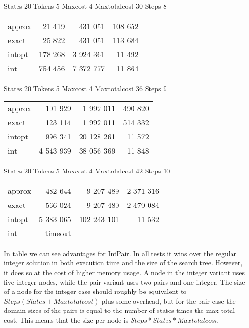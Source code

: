 \documentclass[a4paper,11pt]{article}
\begin{document}
\begin{table}
States 20 Tokens 5 Maxcost 4 Maxtotalcost 30 Steps 8 \\
\begin{tabular}{l r r r}
approx & 21 419 & 431 051 & 108 652 \\
exact & 25 822 & 431 051 & 113 684 \\
intopt & 178 268 & 3 924 361 & 11 492 \\
int & 754 456 & 7 372 777 & 11 864 \\
\end{tabular}
\end{table}

\begin{table}
States 20 Tokens 5 Maxcost 4 Maxtotalcost 36 Steps 9 \\
\begin{tabular}{l r r r}
approx & 101 929 & 1 992 011 & 490 820 \\
exact & 123 114 & 1 992 011 & 514 332 \\
intopt & 996 341 & 20 128 261 & 11 572 \\
int & 4 543 939 & 38 056 369 & 11 848 \\
\end{tabular}
\end{table}

\begin{table}
States 20 Tokens 5 Maxcost 4 Maxtotalcost 42 Steps 10 \\
\begin{tabular}{l r r r}
approx & 482 644 & 9 207 489 & 2 371 316 \\
exact & 566 024 & 9 207 489 & 2 479 084 \\
intopt & 5 383 065 & 102 243 101 & 11 532 \\
int & timeout \\
\end{tabular}
\end{table}
In table we can see advantages for IntPair. In all tests it wins over the regular integer solution in both execution time and the size of the search tree. However, it does so at the cost of higher memory usage. A node in the integer variant uses five integer nodes, while the pair variant uses two pairs and one integer. The size of a node for the integer case should roughly be equivalent to $Steps(States + Maxtotalcost)$ plus some overhead, but for the pair case the domain sizes of the pairs is equal to the number of states times the max total cost. This means that the size per node is $Steps*States*Maxtotalcost$.
\end{document}
